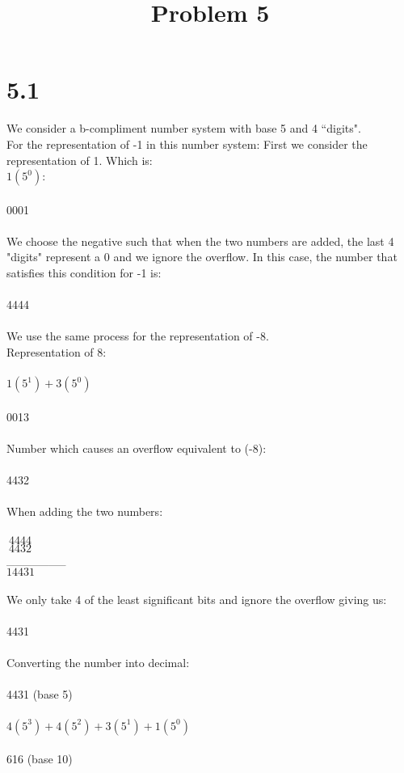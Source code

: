 \documentclass{article}
\begin{document}
    \title{\textbf{Problem 5}}
    \maketitle

    \section{5.1}

    We consider a b-compliment number system with base 5 and 4 ``digits".\\
    For the representation of -1 in this number system:
    First we consider the representation of 1. Which is:\\
    $1(5 ^ 0)$:\\
    \\
    0001\\
    \\
    We choose the negative such that when the two numbers are added, the last 4 "digits" represent a 0 and we ignore the overflow.
    In this case, the number that satisfies this condition for -1 is:\\
    \\
    4444\\
    \\
    We use the same process for the representation of -8.\\
    Representation of 8:\\
    \\
    $1(5 ^ 1) + 3(5 ^ 0)$\\
    \\
    0013\\
    \\
    Number which causes an overflow equivalent to (-8):\\
    \\
    4432\\
    \\
    When adding the two numbers:\\
    \\ 
    $\ 4444$\\
    $\ 4432$\\
    \_\_\_\_\_\_\_\\
    $14431$\\
    \\
    We only take 4 of the least significant bits and ignore the overflow giving us:\\
    \\
    4431\\
    \\
    Converting the number into decimal:\\
    \\
    4431 (base 5)\\
    \\
    $4(5 ^ 3) + 4(5 ^ 2) + 3(5 ^ 1) + 1(5 ^ 0)$\\
    \\
    616 (base 10)
	\\\\
	\\\\
\end{document}
